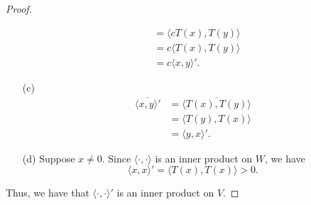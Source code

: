\begin{proof}
\begin{enumerate}
\begin{align*}
                                    &=  \langle c T(x)  , T(y) \rangle \\
                                    &=  c \langle T(x)  , T(y) \rangle \\
                                    &=  c \langle x  , y \rangle'.
        \end{align*}
    \item[(c)] 
        \begin{align*}
            \overline{\langle x , y \rangle'} &= \overline{\langle T(x)  , T(y) \rangle}  \\
                                              &=  \langle T(y)  , T(x) \rangle \\
                                              &=  \langle y , x \rangle'.
        \end{align*}
    \item[(d)] Suppose \( x \neq 0  \). Since \( \langle \cdot , \cdot \rangle \) is an inner product on \( W  \), we have 
        \[  \langle x , x \rangle' = \langle T(x)  , T(x)  \rangle > 0. \]
\end{enumerate}
Thus, we have that \( \langle \cdot , \cdot \rangle'  \) is an inner product on \( V  \).
\end{proof}

